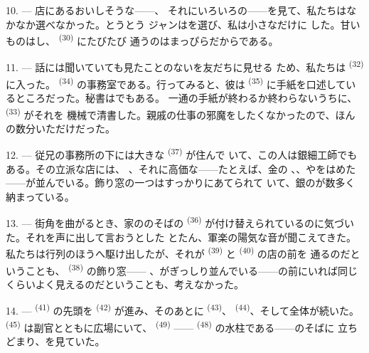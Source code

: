 10. --- 店にあるおいしそうな——、
それにいろいろの——を見て、私たちはなかなか選べなかった。とうとう
ジャンはを選び、私は小さなだけに
した。甘いものはし、 \textsuperscript{(30)} にたびたび
通うのはまっぴらだからである。

\VUsaut{3.0mm}

11. --- 話には聞いていても見たことのないを友だちに見せる
ため、私たちは \textsuperscript{(32)} に入った。
\textsuperscript{(34)} の事務室である。行ってみると、彼は
\textsuperscript{(35)} に手紙を口述しているところだった。秘書はでもある。
一通の手紙が終わるか終わらないうちに、 \textsuperscript{(33)} がそれを
機械で清書した。親戚の仕事の邪魔をしたくなかったので、ほんの数分いただけだった。

12. --- 従兄の事務所の下には大きな \textsuperscript{(37)} が住んで
いて、この人は銀細工師でもある。その立派な店には、
、それに高価な——たとえば、金の
、、やをはめた
——が並んでいる。飾り窓の一つはすっかりにあてられて
いて、銀のが数多く納まっている。

13. --- 街角を曲がるとき、家ののそばの
\textsuperscript{(36)} が付け替えられているのに気づいた。それを声に出して言おうとした
とたん、軍楽の陽気な音が聞こえてきた。私たちは行列のほうへ駆け出したが、それが
 \textsuperscript{(39)} と \textsuperscript{(40)} の店の前を
通るのだということも、 \textsuperscript{(38)} の飾り窓——
、がぎっしり並んでいる——の前にいれば同じ
くらいよく見えるのだということも、考えなかった。

\VUsaut{3.0mm}

14. ---  \textsuperscript{(41)} の先頭を
\textsuperscript{(42)} が進み、そのあとに \textsuperscript{(43)}、
 \textsuperscript{(44)}、そして全体が続いた。
 \textsuperscript{(45)} は副官とともに広場にいて、
\textsuperscript{(49)} —— \textsuperscript{(48)} の水柱である——のそばに
立ちどまり、を見ていた。

